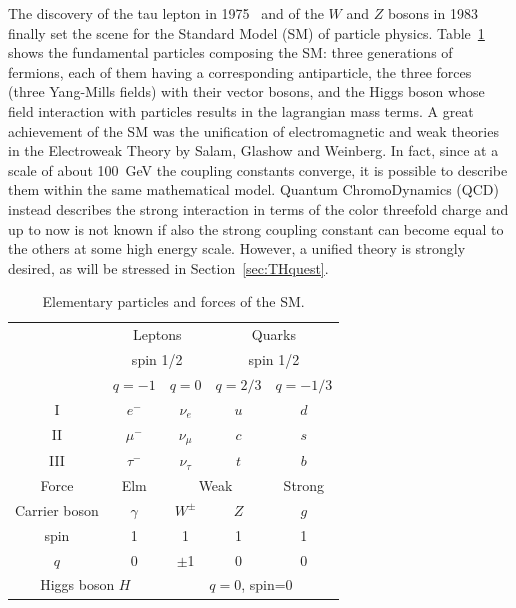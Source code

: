 The discovery of the tau lepton in 1975~\cite{PhysRevLett.35.1489} and of the 
$W$ and $Z$ bosons in 1983~\cite{Arnison1983103,Banner1983476,} finally set the scene for 
the Standard Model (SM) of particle physics. Table~\ref{tab:SM} 
shows the fundamental particles composing the SM: three generations of 
fermions, each of them having a corresponding 
antiparticle, the three forces (three Yang-Mills fields) with 
their vector bosons, and the Higgs boson whose field interaction with
particles results in the lagrangian mass terms. A great achievement of the SM was 
the unification of electromagnetic and weak theories in the Electroweak 
Theory by Salam, Glashow and Weinberg. In fact, since at a scale of about 
100~GeV the coupling constants converge, it is possible to describe them 
within the same mathematical model. Quantum ChromoDynamics (QCD) instead 
describes the strong interaction in terms of the color threefold charge 
and up to now is not known if also the strong coupling constant can become 
equal to the others at some high energy scale. However, a unified theory is 
strongly desired, as will be stressed in Section~\ref{sec:THquest}.
\begin{table}[htb]\centering\begin{tabular}{ccccc}\toprule
&\multicolumn{2}{c}{Leptons}&\multicolumn{2}{c}{Quarks} \\ 
& \multicolumn{2}{c}{spin 1/2}& \multicolumn{2}{c}{spin 1/2}\\
& $q=-1$ & $q=0$ &$q=2/3$ &$q=-1/3$ \\ \midrule
I & $e^{-}$ & $\nu_{e}$ & $u$ & $d$ \\
II & $\mu^{-}$ & $\nu_{\mu}$ & $c$ & $s$ \\
III & $\tau^{-}$ & $\nu_{\tau}$ & $t$ & $b$ \\\bottomrule\toprule
Force & Elm &\multicolumn{2}{c}{Weak}& Strong\\\midrule
Carrier boson & $\gamma$ & $W^{\pm}$ &$Z$ & $g$\\
spin & 1 & 1 &  1 & 1 \\
$q$ & 0 & $\pm$1 & 0 & 0\\\bottomrule\toprule
 \multicolumn{2}{c}{Higgs boson $H$}& \multicolumn{3}{c}{$q=0$, spin=0} \\
\bottomrule
\end{tabular}\caption{Elementary particles and forces of the SM.}\label{tab:SM} \end{table}

